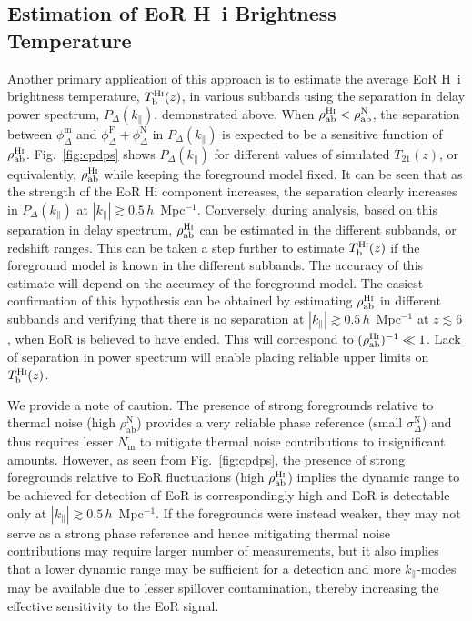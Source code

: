 \documentclass[
reprint,
superscriptaddress,
amsmath,
amssymb,
aps,
prd
]{revtex4-1}
\begin{document}
\subsection{Estimation of EoR H~{\sc i} Brightness Temperature}\label{sec:spin-temp}

Another primary application of this approach is to estimate the average EoR H~{\sc i} brightness temperature, $T_\textrm{b}^\textrm{H{\sc i}}(z)$, in various subbands using the separation in delay power spectrum, $P_\Delta(k_\parallel)$, demonstrated above. When $\rho_\textrm{ab}^\textrm{H{\sc i}} < \rho_\textrm{ab}^\textrm{N}$, the separation between $\phi_\Delta^\textrm{m}$ and $\phi_\Delta^\textrm{F} + \phi_\Delta^\textrm{N}$ in $P_\Delta(k_\parallel)$ is expected to be a sensitive function of $\rho_\textrm{ab}^\textrm{H{\sc i}}$. Fig.~\ref{fig:cpdps} shows $P_\Delta(k_\parallel)$ for different values of simulated $T_{21}(z)$, or equivalently, $\rho_\textrm{ab}^\textrm{H{\sc i}}$ while keeping the foreground model fixed. It can be seen that as the strength of the EoR H{\sc i} component increases, the separation clearly increases in $P_\Delta(k_\parallel)$ at $|k_\parallel| \gtrsim 0.5\,h$~Mpc$^{-1}$. Conversely, during analysis, based on this separation in delay spectrum, $\rho_\textrm{ab}^\textrm{H{\sc i}}$ can be estimated in the different subbands, or redshift ranges. This can be taken a step further to estimate $T_\textrm{b}^\textrm{H{\sc i}}(z)$ if the foreground model is known in the different subbands. The accuracy of this estimate will depend on the accuracy of the foreground model. The easiest confirmation of this hypothesis can be obtained by estimating $\rho_\textrm{ab}^\textrm{H{\sc i}}$ in different subbands and verifying that there is no separation at $|k_\parallel| \gtrsim 0.5\,h$~Mpc$^{-1}$ at $z\lesssim 6$, when EoR is believed to have ended. This will correspond to $(\rho_\textrm{ab}^\textrm{H{\sc i}})^{-1} \ll 1$. Lack of separation in power spectrum will enable placing reliable upper limits on $T_\textrm{b}^\textrm{H{\sc i}}(z)$.

We provide a note of caution. The presence of strong foregrounds relative to thermal noise (high $\rho_\textrm{ab}^\textrm{N}$) provides a very reliable phase reference (small $\sigma_\Delta^\textrm{N}$) and thus requires lesser $N_\textrm{m}$ to mitigate thermal noise contributions to insignificant amounts. However, as seen from Fig.~\ref{fig:cpdps}, the presence of strong foregrounds relative to EoR fluctuations (high $\rho_\textrm{ab}^\textrm{H{\sc i}}$) implies the dynamic range to be achieved for detection of EoR is correspondingly high and EoR is detectable only at $|k_\parallel| \gtrsim 0.5\,h$~Mpc$^{-1}$. If the foregrounds were instead weaker, they may not serve as a strong phase reference and hence mitigating thermal noise contributions may require larger number of measurements, but it also implies that a lower dynamic range may be sufficient for a detection and more $k_\parallel$-modes may be available due to lesser spillover contamination, thereby increasing the effective sensitivity to the EoR signal. 
\end{document}
